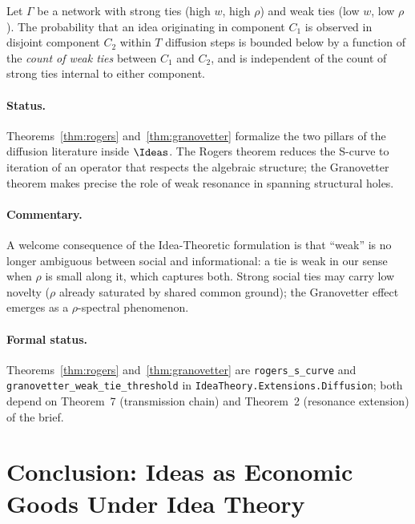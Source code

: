 \begin{theorem}
\label{thm:granovetter}
Let $\Gamma$ be a network with strong ties (high $w$, high $\rho$) and
weak ties (low $w$, low $\rho$). The probability that an idea
originating in component $C_1$ is observed in disjoint component
$C_2$ within $T$ diffusion steps is bounded below by a function of the
\emph{count of weak ties} between $C_1$ and $C_2$, and is independent
of the count of strong ties internal to either component.
\end{theorem}

\paragraph{Status.} Theorems~\ref{thm:rogers} and~\ref{thm:granovetter}
formalize the two pillars of the diffusion literature inside
$\Ideas$. The Rogers theorem reduces the S-curve to iteration of an
operator that respects the algebraic structure; the Granovetter
theorem makes precise the role of weak resonance in spanning structural
holes.

\paragraph{Commentary.} A welcome consequence of the Idea-Theoretic
formulation is that ``weak'' is no longer ambiguous between social and
informational: a tie is weak in our sense when $\rho$ is small along
it, which captures both. Strong social ties may carry low novelty
($\rho$ already saturated by shared common ground); the
Granovetter effect emerges as a $\rho$-spectral phenomenon.

\paragraph{Formal status.} Theorems~\ref{thm:rogers}
and~\ref{thm:granovetter} are \texttt{rogers\_s\_curve} and
\texttt{granovetter\_weak\_tie\_threshold} in
\texttt{IdeaTheory.Extensions.Diffusion}; both depend on Theorem~7
(transmission chain) and Theorem~2 (resonance extension) of the brief.

\section{Conclusion: Ideas as Economic Goods Under Idea Theory}
\label{sec:econ-conclusion}

